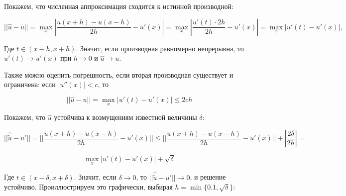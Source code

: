 \documentclass[10pt]{article}
\begin{document}
	Покажем, что численная аппроксимация сходится к истинной производной:
	
	$$||\hat{u} - u|| = \max_x |  \frac{u(x+h) - u(x-h) }{2h} - u'(x)| = \max_x |\frac{u'(t) \cdot 2h}{2h} - u'(x)|=\max_x | u'(t) - u'(x) |, $$
	
	Где $t \in  (x-h, x+h) $. Значит, если производная равномерно непрерывна, то $u'(t) \rightarrow u'(x)$ при $h\rightarrow 0$ и $\hat{u} \rightarrow u$.
	
	Также можно оценить погрешность, если вторая производная существует и ограничена: если $|u''(x)| < c$, то 
	
	$$ ||\hat{u} - u|| = \max_x | u'(t) - u'(x) | \leq 2ch$$
	
	Покажем, что $\hat{u}$ устойчива к возмущениям известной величины $\delta$:
	
	$$ ||\hat{ \tilde{u}} -u'|| = ||\frac{\tilde{u}(x+h) - \tilde{u}(x-h) }{2h} -u'(x)|| \leq ||\frac{u(x+h) - u(x-h) }{2h} -u'(x)|| + |\frac{2\delta}{2h}|=$$ 
	
	$$ \max_x | u'(t) - u'(x) | + \sqrt{\delta}$$
	
	Где $t \in  (x-\delta, x+\delta) $. Значит, если $\delta \rightarrow 0$, то $ ||\hat{ \tilde{u}} -u'|| \rightarrow 0$, и решение устойчиво. Проиллюстрируем это графически, выбирая $h = \min\{0.1, \sqrt{\delta}\}$:
	
\end{document}
